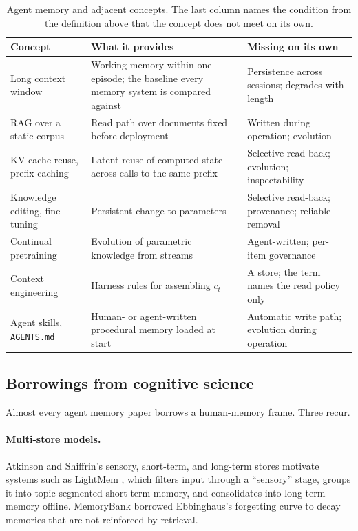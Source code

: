 \documentclass[11pt]{article}
\begin{document}
\begin{table}[t]
\centering\small
\caption{Agent memory and adjacent concepts. The last column names the condition from the definition above that the concept does not meet on its own.}
\label{tab:adjacent}
\begin{tabularx}{\textwidth}{L{3.0cm} X L{3.6cm}}
\toprule
\textbf{Concept} & \textbf{What it provides} & \textbf{Missing on its own} \\
\midrule
Long context window & Working memory within one episode; the baseline every memory system is compared against & Persistence across sessions; degrades with length \citep{hong2025contextrot} \\
RAG over a static corpus & Read path over documents fixed before deployment & Written during operation; evolution \\
KV-cache reuse, prefix caching & Latent reuse of computed state across calls to the same prefix & Selective read-back; evolution; inspectability \\
Knowledge editing, fine-tuning & Persistent change to parameters & Selective read-back; provenance; reliable removal \citep{gupta2024editing} \\
Continual pretraining & Evolution of parametric knowledge from streams & Agent-written; per-item governance \\
Context engineering & Harness rules for assembling $c_t$ \citep{anthropic2025context} & A store; the term names the read policy only \\
Agent skills, \texttt{AGENTS.md} & Human- or agent-written procedural memory loaded at start & Automatic write path; evolution during operation \\
\bottomrule
\end{tabularx}
\end{table}

\subsection{Borrowings from cognitive science}

Almost every agent memory paper borrows a human-memory frame. Three recur.

\paragraph{Multi-store models.} Atkinson and Shiffrin's sensory, short-term, and long-term stores motivate systems such as LightMem \citep{fang2025lightmem}, which filters input through a ``sensory'' stage, groups it into topic-segmented short-term memory, and consolidates into long-term memory offline. MemoryBank \citep{zhong2023memorybank} borrowed Ebbinghaus's forgetting curve to decay memories that are not reinforced by retrieval.
\end{document}
